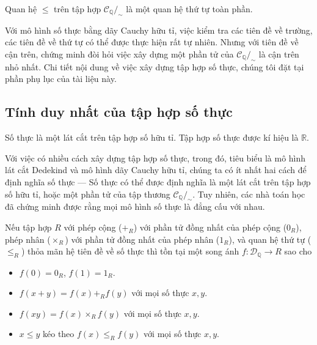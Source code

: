 \begin{theorem}
    Quan hệ $\leq$ trên tập hợp $\mathscr{C}_{\mathbb{Q}}/_{\sim}$ là một quan hệ thứ tự toàn phần.
\end{theorem}

Với mô hình số thực bằng dãy Cauchy hữu tỉ, việc kiểm tra các tiên đề về trường, các tiên đề về thứ tự có thể được thực hiện rất tự nhiên. Nhưng với tiên đề về cận trên, chứng minh đòi hỏi việc xây dựng một phần tử của $\mathscr{C}_{\mathbb{Q}}/_{\sim}$ là cận trên nhỏ nhất. Chi tiết nội dung về việc xây dựng tập hợp số thực, chúng tôi đặt tại phần phụ lục của tài liệu này.

\subsection{Tính duy nhất của tập hợp số thực}

\begin{definition}
    Số thực là một lát cắt trên tập hợp số hữu tỉ. Tập hợp số thực được kí hiệu là $\mathbb{R}$.
\end{definition}

Với việc có nhiều cách xây dựng tập hợp số thực, trong đó, tiêu biểu là mô hình lát cắt Dedekind và mô hình dãy Cauchy hữu tỉ, chúng ta có ít nhất hai cách để định nghĩa số thực --- Số thực có thể được định nghĩa là một lát cắt trên tập hợp số hữu tỉ, hoặc một phần tử của tập thương $\mathscr{C}_{\mathbb{Q}}/_{\sim}$. Tuy nhiên, các nhà toán học đã chứng minh được rằng mọi mô hình số thực là đẳng cấu với nhau.

\begin{theorem}\label{theorem:uniqueness-of-complete-ordered-field}
    Nếu tập hợp $R$ với phép cộng (${+}_{R}$) với phần tử đồng nhất của phép cộng ($0_{R}$), phép nhân (${\times}_{R}$) với phần tử đồng nhất của phép nhân ($1_{R}$), và quan hệ thứ tự ($\leq_{R}$) thỏa mãn hệ tiên đề về số thực thì tồn tại một song ánh $f: \mathscr{D}_{\mathbb{Q}}\to R$ sao cho
    \begin{itemize}[topsep=0pt,itemsep=0pt]
        \item $f(0) = 0_{R}$, $f(1) = 1_{R}$.
        \item $f(x + y) = f(x) +_{R} f(y)$ với mọi số thực $x, y$.
        \item $f(xy) = f(x) \times_{R} f(y)$ với mọi số thực $x, y$.
        \item $x\leq y$ kéo theo $f(x)\leq_{R} f(y)$ với mọi số thực $x, y$.
    \end{itemize}
\end{theorem}

